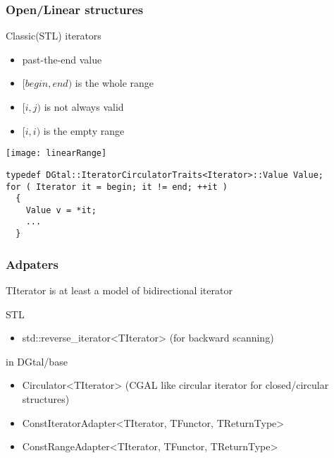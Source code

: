 \begin{frame}[containsverbatim]
  \frametitle{Open/Linear structures}

  \begin{block}{Classic(STL) iterators}
\begin{itemize}
  \item past-the-end value
  \item $[begin,end)$ is the whole range
  \item $[i,j)$ is not always valid
  \item $[i,i)$ is the empty range
\end{itemize}
  \end{block}

 \begin{center}
   \texttt{[image: linearRange]}
 \end{center}

  \begin{lstlisting}
typedef DGtal::IteratorCirculatorTraits<Iterator>::Value Value; 
for ( Iterator it = begin; it != end; ++it )
  {
    Value v = *it; 
    ...
  }
  \end{lstlisting}
\end{frame}

\begin{frame}[containsverbatim]
  \frametitle{Adpaters}

TIterator is at least a model of bidirectional iterator

\begin{block}{STL}
 \begin{itemize}
  \item std::reverse\_iterator<TIterator> (for backward scanning)
 \end{itemize}
\end{block}

\begin{block}{in DGtal/base}
 \begin{itemize}
  \item Circulator<TIterator> (CGAL like circular iterator for closed/circular structures)
  \item ConstIteratorAdapter<TIterator, TFunctor, TReturnType>
  \item ConstRangeAdapter<TIterator, TFunctor, TReturnType>
 \end{itemize}
\end{block}

\end{frame}


